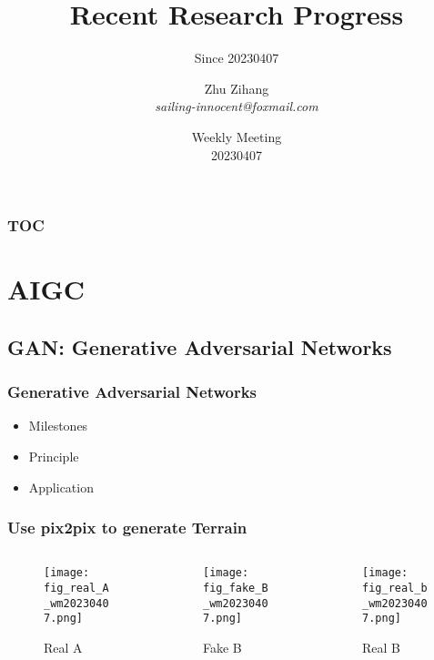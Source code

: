 \documentclass[10pt, hyperref={colorlinks=true,linkcolor=blue},xcolor=dvipsnames]{beamer}
\title[title]{ Recent Research Progress }
\subtitle{Since 20230407}
\author[Zhu Zihang]{\texorpdfstring{Zhu Zihang \\ \smallskip \textit{sailing-innocent@foxmail.com}}{}}
\date[\today]{\texorpdfstring{Weekly Meeting \\ 20230407}{}}
\begin{document}
\begin{frame}
    \titlepage
\end{frame}

\begin{frame}
    \frametitle{TOC}
    \tableofcontents
\end{frame}

\section{AIGC}

\subsection{GAN: Generative Adversarial Networks}

\begin{frame}
    \frametitle{Generative Adversarial Networks}
    \begin{itemize}
        \item Milestones
        \item Principle
        \item Application
    \end{itemize}
\end{frame}



\begin{frame}
    \frametitle{Use pix2pix to generate Terrain}
    \begin{columns}[c] %
        \begin{column}{0.32\textwidth} %
            \begin{figure}
                \texttt{[image: fig\_real\_A\_wm20230407.png]}
                \caption{Real A}
            \end{figure}
        \end{column}
        \begin{column}{0.32\textwidth} %
            \begin{figure}
                \texttt{[image: fig\_fake\_B\_wm20230407.png]}
                \caption{Fake B}
            \end{figure}
        \end{column}
        \begin{column}{0.32\textwidth} %
            \begin{figure}
                \texttt{[image: fig\_real\_b\_wm20230407.png]}
                \caption{Real B}
            \end{figure}
        \end{column}
    \end{columns}
\end{frame}
\end{document}
